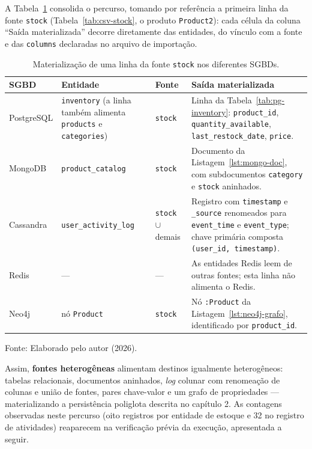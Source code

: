 A Tabela~\ref{tab:exemplo-ecommerce} consolida o percurso, tomando por referência a
primeira linha da fonte \texttt{stock} (Tabela~\ref{tab:csv-stock}, o produto
\texttt{Product2}): cada célula da coluna ``Saída materializada'' decorre diretamente das
entidades, do vínculo com a fonte e das \texttt{columns} declaradas no arquivo de
importação.

\begin{table}[H]
  \caption{Materialização de uma linha da fonte \texttt{stock} nos diferentes SGBDs.}
  \label{tab:exemplo-ecommerce}
  \centering
  \setlength{\extrarowheight}{8pt}%
  \begin{tabular}{
    >{\raggedright\arraybackslash}p{2.15cm}
    >{\raggedright\arraybackslash}p{3.2cm}
    >{\raggedright\arraybackslash}p{2.6cm}
    >{\raggedright\arraybackslash}p{5.3cm}
  }
    \toprule
    \textbf{SGBD} & \textbf{Entidade} & \textbf{Fonte} & \textbf{Saída materializada} \\
    \midrule
    PostgreSQL & \texttt{inventory} (a linha também alimenta \texttt{products} e \texttt{categories}) & \texttt{stock} & Linha da Tabela~\ref{tab:pg-inventory}: \texttt{product\_\allowbreak id}, \texttt{quantity\_\allowbreak available}, \texttt{last\_\allowbreak restock\_\allowbreak date}, \texttt{price}. \\
    MongoDB & \texttt{product\_catalog} & \texttt{stock} & Documento da Listagem~\ref{lst:mongo-doc}, com subdocumentos \texttt{category} e \texttt{stock} aninhados. \\
    Cassandra & \texttt{user\_\allowbreak activity\_\allowbreak log} & \texttt{stock} $\cup$ demais & Registro com \texttt{timestamp} e \texttt{\_source} renomeados para \texttt{event\_\allowbreak time} e \texttt{event\_\allowbreak type}; chave primária composta \texttt{(user\_\allowbreak id, timestamp)}. \\
    Redis & --- & --- & As entidades Redis leem de outras fontes; esta linha não alimenta o Redis. \\
    Neo4j & nó \texttt{Product} & \texttt{stock} & Nó \texttt{:Product} da Listagem~\ref{lst:neo4j-grafo}, identificado por \texttt{product\_\allowbreak id}. \\
    \bottomrule
  \end{tabular}
  \par\vspace{4pt}
  {\footnotesize Fonte: Elaborado pelo autor (2026).}
\end{table}

Assim, \textbf{fontes heterogêneas} alimentam destinos igualmente heterogêneos: tabelas
relacionais, documentos aninhados, \textit{log} colunar com renomeação de colunas e união
de fontes, pares chave-valor e um grafo de propriedades --- materializando a persistência
poliglota descrita no capítulo 2. As contagens observadas neste percurso (oito registros
por entidade de estoque e 32 no registro de atividades) reaparecem na verificação prévia
da execução, apresentada a seguir.

